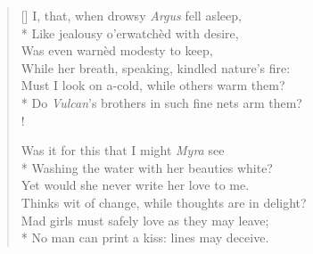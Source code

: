 \documentclass[MAIN]{subfiles}
\begin{document}
\begin{verse}[\versewidth]
I, that, when drowsy \emph{Argus} fell asleep,\\*
\vin Like jealousy o'erwatch\`ed with desire,\\
Was even warn\`ed modesty to keep,\\
\vin While her breath, speaking, kindled nature's fire:\\
Must I look on a-cold, while others warm them?\\*
Do \emph{Vulcan}'s brothers in such fine nets arm them?\\!

Was it for this that I might \emph{Myra} see\\*
\vin Washing the water with her beauties white?\\
Yet would she never write her love to me.\\
\vin Thinks wit of change, while thoughts are in delight?\\
Mad girls must safely love as they may leave;\\*
No man can print a kiss: lines may deceive.
\end{verse}
\end{document}
